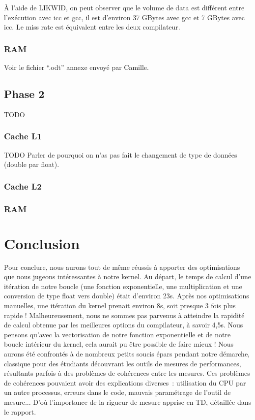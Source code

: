 \documentclass[12pt,a4paper]{article}
\begin{document}
À l'aide de LIKWID, on peut observer que le volume de data est différent 
entre l’exécution avec icc et gcc, il est d'environ 37 GBytes avec gcc et
7 GBytes avec icc. Le miss rate est équivalent entre les deux compilateur.

\subsubsection{RAM}

Voir le fichier \enquote{.odt} annexe envoyé par Camille.

\subsection{Phase 2}

TODO 

\subsubsection{Cache L1}

TODO Parler de pourquoi on n'as pas fait le changement de type de données (double par float).

\subsubsection{Cache L2}

\subsubsection{RAM}

\section{Conclusion}

Pour conclure, nous aurons tout de même réussis à apporter des optimisations que
nous jugeons intéressantes à notre kernel. Au départ, le temps de calcul d'une
itération de notre boucle (une fonction exponentielle, une multiplication et une
conversion de type float vers double) était d'environ 23s. Après nos
optimisations manuelles, une itération du kernel prenait environ 8s, soit
presque 3 fois plus rapide ! Malheureusement, nous ne sommes pas parvenus à
atteindre la rapidité de calcul obtenue par les meilleures options du
compilateur, à savoir 4,5s. Nous pensons qu'avec la vectorisation de notre
fonction exponentielle et de notre boucle intérieur du kernel, cela aurait pu
être possible de faire mieux !
Nous aurons été confrontés à de nombreux petits soucis épars pendant notre
démarche, classique pour des étudiants découvrant les outils de mesures de
performances, résultants parfois à des problèmes de cohérences entre les
mesures. Ces problèmes de cohérences pouvaient avoir des explications diverses :
utilisation du \acs{CPU} par un autre processus, erreurs dans le code, mauvais
paramétrage de l'outil de mesure... D'où l'importance de la rigueur de mesure
apprise en TD, détaillée dans le rapport.
\end{document}
